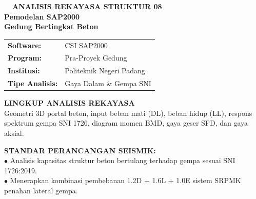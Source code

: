\documentclass[10pt,a4paper,landscape]{article}
\begin{document}
\noindent
\begin{minipage}[t]{0.30\linewidth}
  \vspace{0pt}
  \begin{tcolorbox}[sharp corners, boxrule=0.8pt, colframe=pborder, colback=white, left=3mm, right=3mm, top=2.5mm, bottom=2.5mm, height=100mm]
    \colorbox{pred}{\fontsize{7pt}{8pt}\selectfont\bfseries\color{white}\ \ ANALISIS REKAYASA STRUKTUR 08\ \ }\\[1.5mm]
    {\fontsize{9.5pt}{11.5pt}\selectfont\bfseries\color{pnavy}Pemodelan SAP2000}\\[0.5mm]
    {\fontsize{7pt}{8.5pt}\selectfont\bfseries\color{pred}Gedung Bertingkat Beton}\\[2mm]

    \begin{tcolorbox}[sharp corners, boxrule=0.5pt, colframe=pborder, colback=pbglight, left=2mm, right=2mm, top=1.5mm, bottom=1.5mm]
      \begin{tabularx}{\linewidth}{@{}p{22mm} X@{}}
        {\fontsize{6.8pt}{8pt}\selectfont\bfseries Software:} & {\fontsize{6.8pt}{8pt}\selectfont CSI SAP2000} \\[0.8mm]
        {\fontsize{6.8pt}{8pt}\selectfont\bfseries Program:} & {\fontsize{6.8pt}{8pt}\selectfont Pra-Proyek Gedung} \\[0.8mm]
        {\fontsize{6.8pt}{8pt}\selectfont\bfseries Institusi:} & {\fontsize{6.8pt}{8pt}\selectfont Politeknik Negeri Padang} \\[0.8mm]
        {\fontsize{6.8pt}{8pt}\selectfont\bfseries Tipe Analisis:} & {\fontsize{6.8pt}{8pt}\selectfont Gaya Dalam \& Gempa SNI}
      \end{tabularx}
    \end{tcolorbox}
    \vspace{1.5mm}

    {\fontsize{7.5pt}{9pt}\selectfont\bfseries\color{pnavy}LINGKUP ANALISIS REKAYASA}\\[0.8mm]
    {\fontsize{6.5pt}{8.2pt}\selectfont\color{psteel}
    Geometri 3D portal beton, input beban mati (DL), beban hidup (LL), respons spektrum gempa SNI 1726, diagram momen BMD, gaya geser SFD, dan gaya aksial.
    }
  \end{tcolorbox}
  \vspace{2mm}

  \begin{tcolorbox}[sharp corners, boxrule=0.6pt, colframe=pnavy, colback=pbglight, left=2.5mm, right=2.5mm, top=2mm, bottom=2mm, height=52mm]
    {\fontsize{7pt}{8.5pt}\selectfont\bfseries\color{pnavy}STANDAR PERANCANGAN SEISMIK:}\\[1.5mm]
    {\fontsize{6.5pt}{8.2pt}\selectfont\color{psteel}
    $\bullet$ Analisis kapasitas struktur beton bertulang terhadap gempa sesuai SNI 1726:2019.\\
    $\bullet$ Menerapkan kombinasi pembebanan 1.2D + 1.6L + 1.0E sistem SRPMK penahan lateral gempa.
    }
  \end{tcolorbox}
\end{minipage}%
\end{document}
